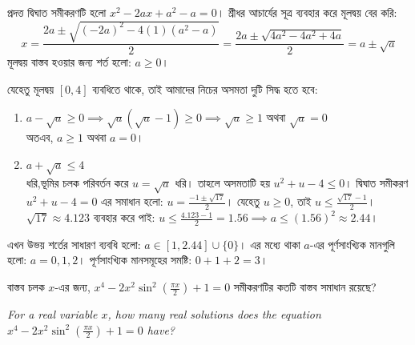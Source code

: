 \documentclass[12pt, a4paper]{article}
\begin{document}
\begin{tcolorbox}[solutionbox={সমাধান (Solution)}]
    \noindent
    প্রদত্ত দ্বিঘাত সমীকরণটি হলো $x^2 - 2ax + a^2 - a = 0$। শ্রীধর আচার্যের সূত্র ব্যবহার করে মূলদ্বয় বের করি:
    \[ x = \frac{2a \pm \sqrt{(-2a)^2 - 4(1)(a^2-a)}}{2} = \frac{2a \pm \sqrt{4a^2 - 4a^2 + 4a}}{2} = a \pm \sqrt{a} \]
    মূলদ্বয় বাস্তব হওয়ার জন্য শর্ত হলো: $a \ge 0$।
    
    \vspace{0.5em}
    যেহেতু মূলদ্বয় $[0, 4]$ ব্যবধিতে থাকে, তাই আমাদের নিচের অসমতা দুটি সিদ্ধ হতে হবে:
    \begin{enumerate}[itemsep=0.4em]
        \item $a - \sqrt{a} \ge 0 \implies \sqrt{a}(\sqrt{a}-1) \ge 0 \implies \sqrt{a} \ge 1 \text{ অথবা } \sqrt{a} = 0$ \\
        অতএব, $a \ge 1$ অথবা $a = 0$।
        
        \item $a + \sqrt{a} \le 4$ \\
        ধরি,ভূমির চলক পরিবর্তন করে $u = \sqrt{a}$ ধরি। তাহলে অসমতাটি হয় $u^2 + u - 4 \le 0$। 
        দ্বিঘাত সমীকরণ $u^2+u-4=0$ এর সমাধান হলো: $u = \frac{-1 \pm \sqrt{17}}{2}$। 
        যেহেতু $u \ge 0$, তাই $u \le \frac{\sqrt{17}-1}{2}$। 
        $\sqrt{17} \approx 4.123$ ব্যবহার করে পাই: $u \le \frac{4.123-1}{2} = 1.56 \implies a \le (1.56)^2 \approx 2.44$।
    \end{enumerate}
    
    \vspace{0.5em}
    এখন উভয় শর্তের সাধারণ ব্যবধি হলো: $a \in [1, 2.44] \cup \{0\}$।
    এর মধ্যে থাকা $a$-এর পূর্ণসাংখ্যিক মানগুলি হলো: $a = 0, 1, 2$।
    পূর্ণসাংখ্যিক মানসমূহের সমষ্টি: $0 + 1 + 2 = 3$।
\end{tcolorbox}

\vspace{1.5em}

\begin{tcolorbox}[questionbox={প্রশ্ন (Question) 31}]
    \noindent
    বাস্তব চলক $x$-এর জন্য, $x^4 - 2x^2 \sin^2\left(\frac{\pi x}{2}\right) + 1 = 0$ সমীকরণটির কতটি বাস্তব সমাধান রয়েছে?
    
    \vspace{0.8em}
    \begin{english}
    \noindent\textit{\color{darkgray}
    For a real variable $x$, how many real solutions does the equation $x^4 - 2x^2 \sin^2\left(\frac{\pi x}{2}\right) + 1 = 0$ have?
    }
    \end{english}
\end{tcolorbox}
\end{document}
